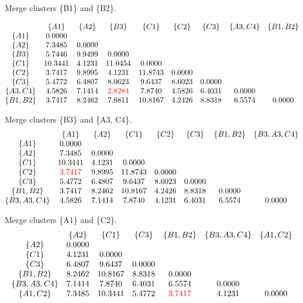 \documentclass{article}
\begin{document}
Merge clusters \{B1\} and \{B2\}.

\begin{align*}
    \begin{matrix}
         & \{A1\} & \{A2\} & \{B3\} & \{C1\} & \{C2\} & \{C3\} & \{A3,C4\} & \{B1,B2\} \\
        \{A1\} & 0.0000 \\
        \{A2\} & 7.3485 & 0.0000 \\
        \{B3\} & 5.7446 & 9.9499 & 0.0000 \\
        \{C1\} & 10.3441 & 4.1231 & 11.0454 & 0.0000 \\
        \{C2\} & 3.7417 & 9.8995 & 4.1231 & 11.8743 & 0.0000 \\
        \{C3\} & 5.4772 & 6.4807 & 8.0623 & 9.6437 & 8.6023 & 0.0000 \\
        \{A3,C4\} & 4.5826 & 7.1414 & $\color{red}2.8284$ & 7.8740 & 4.5826 & 6.4031 & 0.0000 \\
        \{B1,B2\} & 3.7417 & 8.2462 & 7.6811 & 10.8167 & 4.2426 & 8.8318 & 6.5574 & 0.0000 \\
    \end{matrix}
\end{align*}

Merge clusters \{B3\} and \{A3, C4\}.
\begin{align*}
    \begin{matrix}
         & \{A1\} & \{A2\} & \{C1\} & \{C2\} & \{C3\} & \{B1,B2\} & \{B3,A3,C4\} \\
        \{A1\} & 0.0000 \\
        \{A2\} & 7.3485 & 0.0000 \\
        \{C1\} & 10.3441 & 4.1231 & 0.0000 \\
        \{C2\} & $\color{red}3.7417$ & 9.8995 & 11.8743 & 0.0000 \\
        \{C3\} & 5.4772 & 6.4807 & 9.6437 & 8.6023 & 0.0000 \\
        \{B1,B2\} & 3.7417 & 8.2462 & 10.8167 & 4.2426 & 8.8318 & 0.0000 \\
        \{B3,A3,C4\} & 4.5826 & 7.1414 & 7.8740 & 4.1231 & 6.4031 & 6.5574 & 0.0000 \\
    \end{matrix}
\end{align*}

Merge clusters \{A1\} and \{C2\}.
\begin{align*}
    \begin{matrix}
         & \{A2\} & \{C1\} & \{C3\} & \{B1,B2\} & \{B3,A3,C4\} & \{A1,C2\} \\
        \{A2\} & 0.0000 \\
        \{C1\} & 4.1231 & 0.0000 \\
        \{C3\} & 6.4807 & 9.6437 & 0.0000 \\
        \{B1,B2\} & 8.2462 & 10.8167 & 8.8318 & 0.0000 \\
        \{B3,A3,C4\} & 7.1414 & 7.8740 & 6.4031 & 6.5574 & 0.0000 \\
        \{A1,C2\} & 7.3485 & 10.3441 & 5.4772 & $\color{red}3.7417$ & 4.1231 & 0.0000 \\
    \end{matrix}
\end{align*}
\end{document}
